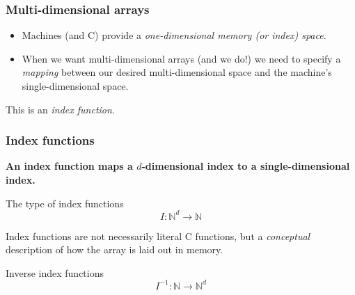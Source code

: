 \documentclass[rgb,dvipsnames,aspectratio=169,xcolor=table]{beamer}
\begin{document}
\begin{frame}
  \frametitle{Multi-dimensional arrays}

  \begin{itemize}
  \item Machines (and C) provide a \textit{one-dimensional memory (or
      index) space}.
  \item When we want multi-dimensional arrays (and we do!) we need to
    specify a \textit{mapping} between our desired multi-dimensional
    space and the machine's single-dimensional space.
  \end{itemize}

  \begin{center}
    This is an \textit{index function}.
  \end{center}

\end{frame}

\begin{frame}
  \frametitle{Index functions}

\begin{center}
  \textbf{An index function maps a $d$-dimensional index to a
    single-dimensional index.}
\end{center}

\begin{block}{The type of index functions}
\begin{equation*}
  I : \mathbb{N}^{d} \rightarrow \mathbb{N}
\end{equation*}
\end{block}

\begin{center}
  Index functions are not necessarily literal C functions, but a
  \textit{conceptual} description of how the array is laid out in
  memory.
\end{center}

\pause

\begin{block}{Inverse index functions}
\begin{equation*}
  I^{-1} : \mathbb{N} \rightarrow \mathbb{N}^{d}
\end{equation*}
\end{block}
\end{frame}
\end{document}
